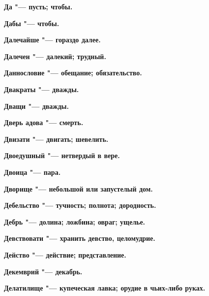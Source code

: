  





\bfseries Да \normalfont{} "--- пусть; чтобы. 




\bfseries Дабы \normalfont{} "--- чтобы. 




\bfseries Далечайше \normalfont{} "--- гораздо далее. 




\bfseries Далечен \normalfont{} "--- далекий; трудный. 




\bfseries Даннословие \normalfont{} "--- обещание; обязательство. 




\bfseries Двакраты \normalfont{} "--- дважды. 




\bfseries Дващи \normalfont{} "--- дважды. 




\bfseries Дверь адова \normalfont{} "--- смерть. 




\bfseries Двизати \normalfont{} "--- двигать; шевелить. 




\bfseries Двоедушный \normalfont{} "--- нетвердый в вере. 




\bfseries Двоица \normalfont{} "--- пара. 




\bfseries Дворище \normalfont{} "--- небольшой или запустелый дом. 




\bfseries Дебельство \normalfont{} "--- тучность; полнота; дородность. 




\bfseries Дебрь \normalfont{} "--- долина; ложбина; овраг; ущелье. 




\bfseries Девствовати \normalfont{} "--- хранить девство, целомудрие. 




\bfseries Действо \normalfont{} "--- действие; представление. 




\bfseries Декемврий \normalfont{} "--- декабрь. 




\bfseries Делатилище \normalfont{} "--- купеческая лавка; орудие в чьих-либо руках. 




